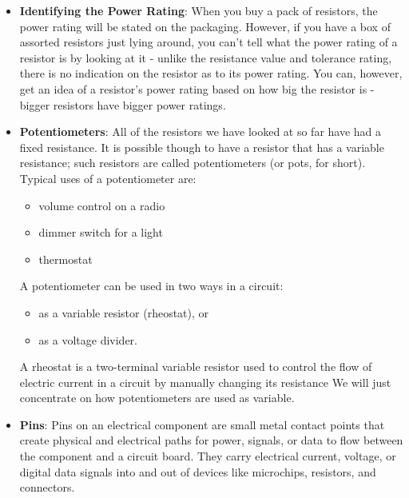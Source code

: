\documentclass{report}
\begin{document}
\begin{itemize}
            For a resistor with a power rating of 1/8 (0.125) W, this would be too much power to dissipate. However, for a 1/4 (0.25) W resistor, this would be acceptable.
            \bigbreak \noindent 
            Exceeding a resistor's power rating causes it to overheat, permanently change its resistance value, burn out, or potentially catch fire
        \item \textbf{Identifying the Power Rating}:  When you buy a pack of resistors, the power rating will be stated on the packaging. However, if you have a box of assorted resistors just lying around, you can't tell what the power rating of a resistor is by looking at it - unlike the resistance value and tolerance rating, there is no indication on the resistor as to its power rating. You can, however, get an idea of a resistor's power rating based on how big the resistor is - bigger resistors have bigger power ratings.
        \item \textbf{Potentiometers}: All of the resistors we have looked at so far have had a fixed resistance. It is possible though to have a resistor that has a variable resistance; such resistors are called potentiometers (or pots, for short). Typical uses of a potentiometer are:
            \begin{itemize}
                \item volume control on a radio
                \item dimmer switch for a light
                \item thermostat
            \end{itemize}
            A potentiometer can be used in two ways in a circuit:
            \begin{itemize}
                \item as a variable resistor (rheostat), or
                \item as a voltage divider.
            \end{itemize}
            A rheostat is a two-terminal variable resistor used to control the flow of electric current in a circuit by manually changing its resistance
            \bigbreak \noindent 
            We will just concentrate on how potentiometers are used as variable.
        \item \textbf{Pins}: Pins on an electrical component are small metal contact points that create physical and electrical paths for power, signals, or data to flow between the component and a circuit board. They carry electrical current, voltage, or digital data signals into and out of devices like microchips, resistors, and connectors.

\end{itemize}
\end{document}

